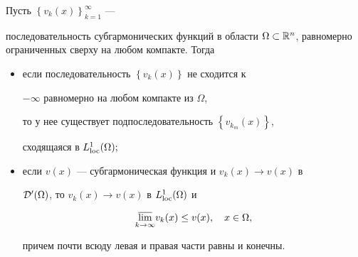 \begin{thm}


\label{theor3}


Пусть $\left\{v_k(x)\right\}_{k=1}^{\infty}$ --- 


последовательность субгармонических функций в области $\Omega\subset\Bbb 


R^n$, равномерно ограниченных сверху на любом компакте. Тогда 


\begin{itemize}


\item[a)] если последовательность $\left\{v_k(x)\right\}$ не сходится к


$-\infty$ равномерно на любом компакте из $\Omega$, 


то у нее существует подпоследовательность $\left\{v_{k_m}(x)\right\}$, 


сходящаяся в $L^1_{\operatorname{loc}}(\Omega);$


\item[б)] если $v(x)$ --- субгармоническая функция и $v_k(x)\to v (x)$ в 


${\cal D}^{\prime}(\Omega)$, то $v_k(x)\to v (x)$ в $L^1_{\operatorname{loc}}(\Omega)$ и 


$$


\underset{k\to\infty}{\varlimsup}{}v_k(x)\le v(x), \quad x\in\Omega,


$$


причем почти всюду левая и правая части равны и конечны. 


\end{itemize}


\end{thm} 





